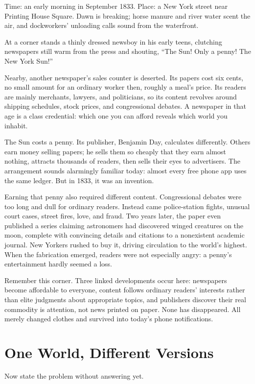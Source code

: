 Time: an early morning in September 1833. Place: a New York street near Printing House Square. Dawn is breaking; horse manure and river water scent the air, and dockworkers' unloading calls sound from the waterfront.

At a corner stands a thinly dressed newsboy in his early teens, clutching newspapers still warm from the press and shouting, ``The Sun! Only a penny! The New York Sun!''

Nearby, another newspaper's sales counter is deserted. Its papers cost six cents, no small amount for an ordinary worker then, roughly a meal's price. Its readers are mainly merchants, lawyers, and politicians, so its content revolves around shipping schedules, stock prices, and congressional debates. A newspaper in that age is a class credential: which one you can afford reveals which world you inhabit.

The Sun costs a penny. Its publisher, Benjamin Day, calculates differently. Others earn money selling papers; he sells them so cheaply that they earn almost nothing, attracts thousands of readers, then sells their eyes to advertisers. The arrangement sounds alarmingly familiar today: almost every free phone app uses the same ledger. But in 1833, it was an invention.

Earning that penny also required different content. Congressional debates were too long and dull for ordinary readers. Instead came police-station fights, unusual court cases, street fires, love, and fraud. Two years later, the paper even published a series claiming astronomers had discovered winged creatures on the moon, complete with convincing details and citations to a nonexistent academic journal. New Yorkers rushed to buy it, driving circulation to the world's highest. When the fabrication emerged, readers were not especially angry: a penny's entertainment hardly seemed a loss.

Remember this corner. Three linked developments occur here: newspapers become affordable to everyone, content follows ordinary readers' interests rather than elite judgments about appropriate topics, and publishers discover their real commodity is attention, not news printed on paper. None has disappeared. All merely changed clothes and survived into today's phone notifications.

\section{One World, Different Versions}
Now state the problem without answering yet.

